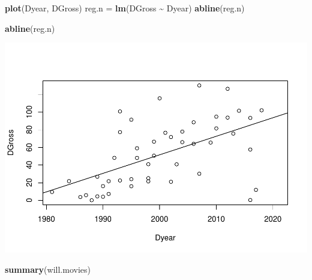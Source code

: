 \documentclass[]{article}
\newenvironment{Shaded}{\begin{snugshade}}{\end{snugshade}}
\newcommand{\KeywordTok}[1]{\textcolor[rgb]{0.13,0.29,0.53}{\textbf{#1}}}
\newcommand{\NormalTok}[1]{#1}
\newcommand{\OperatorTok}[1]{\textcolor[rgb]{0.81,0.36,0.00}{\textbf{#1}}}
\newcommand{\StringTok}[1]{\textcolor[rgb]{0.31,0.60,0.02}{#1}}
\begin{document}
\begin{Shaded}
\begin{Highlighting}[]
\KeywordTok{plot}\NormalTok{(Dyear, DGross)}
\NormalTok{reg.n =}\StringTok{ }\KeywordTok{lm}\NormalTok{(DGross }\OperatorTok{\textasciitilde{}}\StringTok{ }\NormalTok{Dyear)}
\KeywordTok{abline}\NormalTok{(reg.n)}

\KeywordTok{abline}\NormalTok{(reg.n)}
\end{Highlighting}
\end{Shaded}

\includegraphics{Denzel-v-Will-data_files/figure-latex/unnamed-chunk-5-8.pdf}

\begin{Shaded}
\begin{Highlighting}[]
\KeywordTok{summary}\NormalTok{(will.movies)}
\end{Highlighting}
\end{Shaded}
\end{document}

